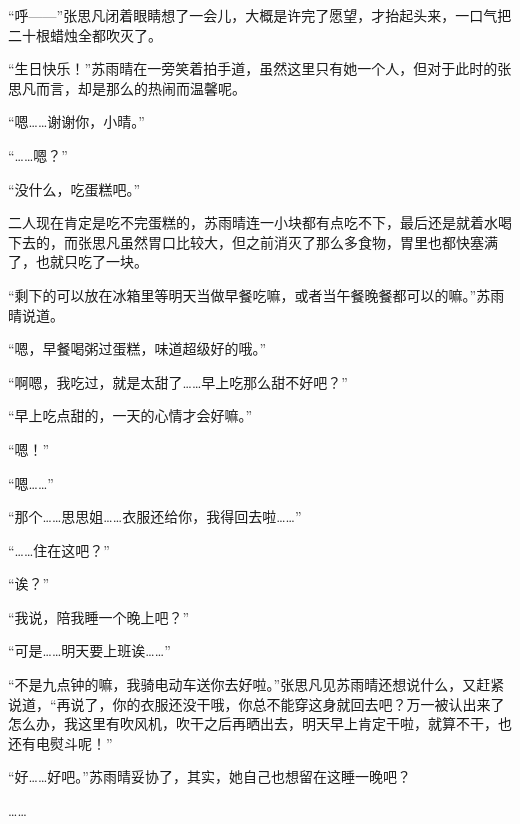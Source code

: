 “呼——”张思凡闭着眼睛想了一会儿，大概是许完了愿望，才抬起头来，一口气把二十根蜡烛全都吹灭了。

“生日快乐！”苏雨晴在一旁笑着拍手道，虽然这里只有她一个人，但对于此时的张思凡而言，却是那么的热闹而温馨呢。

“嗯……谢谢你，小晴。”

“……嗯？”

“没什么，吃蛋糕吧。”

二人现在肯定是吃不完蛋糕的，苏雨晴连一小块都有点吃不下，最后还是就着水喝下去的，而张思凡虽然胃口比较大，但之前消灭了那么多食物，胃里也都快塞满了，也就只吃了一块。

“剩下的可以放在冰箱里等明天当做早餐吃嘛，或者当午餐晚餐都可以的嘛。”苏雨晴说道。

“嗯，早餐喝粥过蛋糕，味道超级好的哦。”

“啊嗯，我吃过，就是太甜了……早上吃那么甜不好吧？”

“早上吃点甜的，一天的心情才会好嘛。”

“嗯！”

“嗯……”

“那个……思思姐……衣服还给你，我得回去啦……”

“……住在这吧？”

“诶？”

“我说，陪我睡一个晚上吧？”

“可是……明天要上班诶……”

“不是九点钟的嘛，我骑电动车送你去好啦。”张思凡见苏雨晴还想说什么，又赶紧说道，“再说了，你的衣服还没干哦，你总不能穿这身就回去吧？万一被认出来了怎么办，我这里有吹风机，吹干之后再晒出去，明天早上肯定干啦，就算不干，也还有电熨斗呢！”

“好……好吧。”苏雨晴妥协了，其实，她自己也想留在这睡一晚吧？

……

